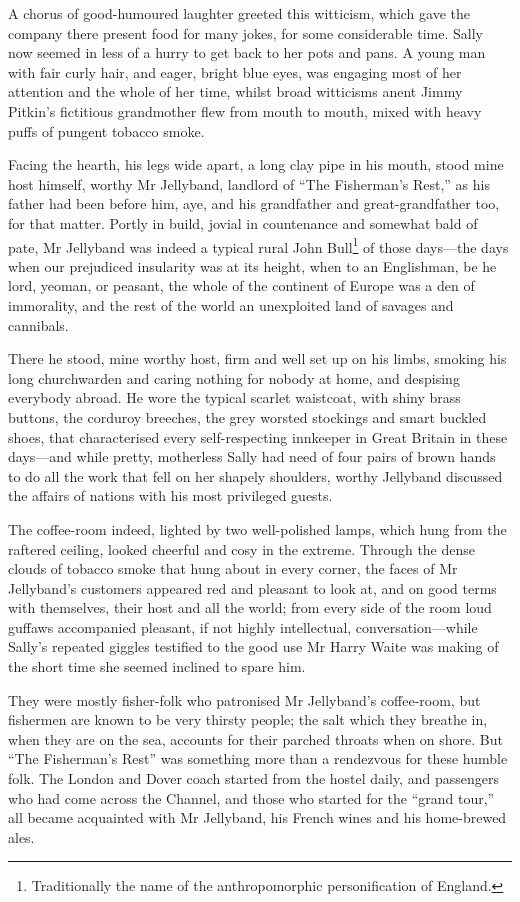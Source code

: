 A chorus of good-humoured laughter greeted this witticism, which gave the company there present food for many jokes, for some considerable time. Sally now seemed in less of a hurry to get back to her pots and pans. A young man with fair curly hair, and eager, bright blue eyes, was engaging most of her attention and the whole of her time, whilst broad witticisms anent Jimmy Pitkin's fictitious grandmother flew from mouth to mouth, mixed with heavy puffs of pungent tobacco smoke.

Facing the hearth, his legs wide apart, a long clay pipe in his mouth, stood mine host himself, worthy Mr Jellyband, landlord of \enquote{The Fisherman's Rest,} as his father had been before him, aye, and his grandfather and great-grandfather too, for that matter. Portly in build, jovial in countenance and somewhat bald of pate, Mr Jellyband was indeed a typical rural John Bull\footnote{Traditionally the name of the anthropomorphic personification of England.} of those days---the days when our prejudiced insularity was at its height, when to an Englishman, be he lord, yeoman, or peasant, the whole of the continent of Europe was a den of immorality, and the rest of the world an unexploited land of savages and cannibals.

There he stood, mine worthy host, firm and well set up on his limbs, smoking his long churchwarden and caring nothing for nobody at home, and despising everybody abroad. He wore the typical scarlet waistcoat, with shiny brass buttons, the corduroy breeches, the grey worsted stockings and smart buckled shoes, that characterised every self-respecting innkeeper in Great Britain in these days---and while pretty, motherless Sally had need of four pairs of brown hands to do all the work that fell on her shapely shoulders, worthy Jellyband discussed the affairs of nations with his most privileged guests.

The coffee-room indeed, lighted by two well-polished lamps, which hung from the raftered ceiling, looked cheerful and cosy in the extreme. Through the dense clouds of tobacco smoke that hung about in every corner, the faces of Mr Jellyband's customers appeared red and pleasant to look at, and on good terms with themselves, their host and all the world; from every side of the room loud guffaws accompanied pleasant, if not highly intellectual, conversation---while Sally's repeated giggles testified to the good use Mr Harry Waite was making of the short time she seemed inclined to spare him.

They were mostly fisher-folk who patronised Mr Jellyband's coffee-room, but fishermen are known to be very thirsty people; the salt which they breathe in, when they are on the sea, accounts for their parched throats when on shore. But \enquote{The Fisherman's Rest} was something more than a rendezvous for these humble folk. The London and Dover coach started from the hostel daily, and passengers who had come across the Channel, and those who started for the \enquote{grand tour,} all became acquainted with Mr Jellyband, his French wines and his home-brewed ales.

